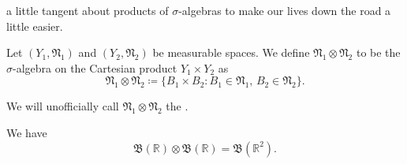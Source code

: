 \documentclass[notoc,notitlepage]{tufte-book}
\begin{document}
 a little tangent about products of $\sigma$-algebras
to make our lives down the road a little easier.

\begin{defn}\label{defn:products_of_sigma_algebras}
  Let $(Y_1, \mathfrak{N}_1)$ and $(Y_2, \mathfrak{N}_2)$ be measurable spaces.
  We define $\mathfrak{N}_1 \otimes \mathfrak{N}_2$ to be the $\sigma$-algebra
  on the Cartesian product $Y_1 \times Y_2$ as
  \begin{equation*}
    \mathfrak{N}_1 \otimes \mathfrak{N}_2 \coloneqq \{
      B_1 \times B_2 : B_1 \in \mathfrak{N}_1,\, B_2 \in \mathfrak{N}_2
    \}.
  \end{equation*}
\end{defn}

\begin{remark}
  We will unofficially call $\mathfrak{N}_1 \otimes \mathfrak{N}_2$
  the .
\end{remark}

\begin{propo}\label{propo:tensor_product_of_mathfrak_b_mathbb_r_s}
  We have
  \begin{equation*}
    \mathfrak{B}(\mathbb{R}) \otimes \mathfrak{B}(\mathbb{R})
      = \mathfrak{B}(\mathbb{R}^2).
  \end{equation*}
\end{propo}
\end{document}
